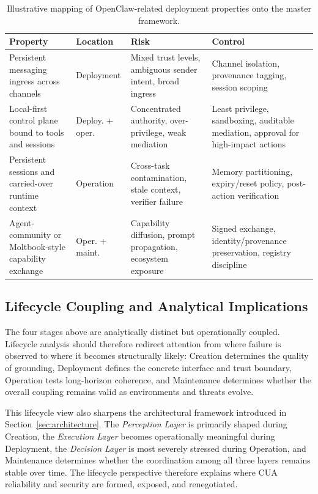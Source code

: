 \begin{table}[!t]
\centering
\scriptsize
\caption{Illustrative mapping of OpenClaw-related deployment properties onto the master framework.}
\label{tab:openclaw_mapping}
\renewcommand{\arraystretch}{1.08}
\setlength{\tabcolsep}{3.5pt}
\begin{tabularx}{\textwidth}{L{2.75cm} L{1.8cm} L{2.8cm} Y}
\toprule
\textbf{Property} & \textbf{Location} & \textbf{Risk} & \textbf{Control} \\
\midrule
Persistent messaging ingress across channels~\cite{openclaw2026website,ibm2026openclaw} & Deployment & Mixed trust levels, ambiguous sender intent, broad ingress & Channel isolation, provenance tagging, session scoping \\
Local-first control plane bound to tools and sessions~\cite{openclaw2026website} & Deploy. + oper. & Concentrated authority, over-privilege, weak mediation & Least privilege, sandboxing, auditable mediation, approval for high-impact actions \\
Persistent sessions and carried-over runtime context & Operation & Cross-task contamination, stale context, verifier failure & Memory partitioning, expiry/reset policy, post-action verification \\
Agent-community or Moltbook-style capability exchange~\cite{chen2026openclaw} & Oper. + maint. & Capability diffusion, prompt propagation, ecosystem exposure & Signed exchange, identity/provenance preservation, registry discipline \\
\bottomrule
\end{tabularx}
\end{table}

\subsection{Lifecycle Coupling and Analytical Implications}

The four stages above are analytically distinct but operationally coupled. Lifecycle analysis should therefore redirect attention from where failure is observed to where it becomes structurally likely: Creation determines the quality of grounding, Deployment defines the concrete interface and trust boundary, Operation tests long-horizon coherence, and Maintenance determines whether the overall coupling remains valid as environments and threats evolve.

This lifecycle view also sharpens the architectural framework introduced in Section~\ref{sec:architecture}. The \emph{Perception Layer} is primarily shaped during Creation, the \emph{Execution Layer} becomes operationally meaningful during Deployment, the \emph{Decision Layer} is most severely stressed during Operation, and Maintenance determines whether the coordination among all three layers remains stable over time. The lifecycle perspective therefore explains where CUA reliability and security are formed, exposed, and renegotiated.

